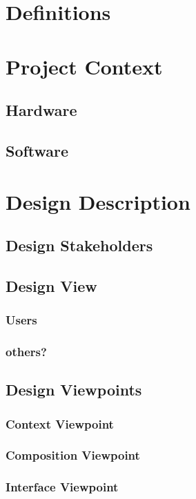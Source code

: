 \documentclass[onecolumn, draftclsnofoot,10pt, compsoc]{IEEEtran}
\begin{document}
\section{Definitions}


\section{Project Context}
\subsection{Hardware}
\subsection{Software}

\section{Design Description}
\subsection{Design Stakeholders}
\subsection{Design View}
\subsubsection{Users}
\subsubsection{others?}%
\subsection{Design Viewpoints}
\subsubsection{Context Viewpoint}
\subsubsection{Composition Viewpoint}
\subsubsection{Interface Viewpoint}
\end{document}
